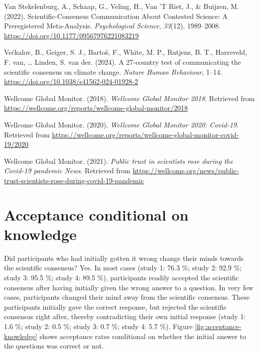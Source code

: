 \documentclass[
  doc,floatsintext]{apa6}
\newlength{\cslhangindent}
\newenvironment{CSLReferences}[2] %
 {\begin{list}{}{%
  \setlength{\itemindent}{0pt}
  \setlength{\leftmargin}{0pt}
  \setlength{\parsep}{0pt}
  \ifodd #1
   \setlength{\leftmargin}{\cslhangindent}
   \setlength{\itemindent}{-1\cslhangindent}
  \fi
  \setlength{\itemsep}{#2\baselineskip}}}
 {\end{list}}
\begin{document}
\begin{CSLReferences}{1}{0}
Van Stekelenburg, A., Schaap, G., Veling, H., Van 'T Riet, J., \& Buijzen, M. (2022). Scientific-Consensus Communication About Contested Science: A Preregistered Meta-Analysis. \emph{Psychological Science}, \emph{33}(12), 1989--2008. \url{https://doi.org/10.1177/09567976221083219}

Većkalov, B., Geiger, S. J., Bartoš, F., White, M. P., Rutjens, B. T., Harreveld, F. van, \ldots{} Linden, S. van der. (2024). A 27-country test of communicating the scientific consensus on climate change. \emph{Nature Human Behaviour}, 1--14. \url{https://doi.org/10.1038/s41562-024-01928-2}

Wellcome Global Monitor. (2018). \emph{Wellcome Global Monitor 2018}. Retrieved from \url{https://wellcome.org/reports/wellcome-global-monitor/2018}

Wellcome Global Monitor. (2020). \emph{Wellcome Global Monitor 2020: Covid-19}. Retrieved from \url{https://wellcome.org/reports/wellcome-global-monitor-covid-19/2020}

Wellcome Global Monitor. (2021). \emph{Public trust in scientists rose during the Covid-19 pandemic \textbar{} News}. Retrieved from \url{https://wellcome.org/news/public-trust-scientists-rose-during-covid-19-pandemic}

\end{CSLReferences}

\newpage

\appendix


\section{Acceptance conditional on knowledge}\label{acceptance-knowledge}

Did participants who had initially gotten it wrong change their minds towards the scientific consensus? Yes. In most cases (study 1: 76.3 \%; study 2: 92.9 \%; study 3: 95.5 \%; study 4: 89.5 \%), participants readily accepted the scientific consensus after having initially given the wrong answer to a question. In very few cases, participants changed their mind away from the scientific consensus. These participants initially gave the correct response, but rejected the scientific consensus right after, thereby contradicting their own initial response (study 1: 1.6 \%; study 2: 0.5 \%; study 3: 0.7 \%; study 4: 5.7 \%). Figure \ref{fig:acceptance-knowledge} shows acceptance rates conditional on whether the initial answer to the questions was correct or not.
\end{document}
